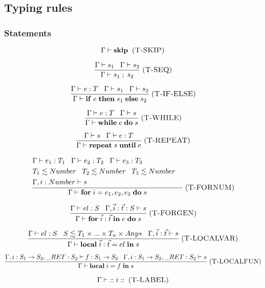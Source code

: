 \documentclass[12pt]{article}
\newcommand{\mylabel}[1]{\; (\textsc{#1})}
\newcommand{\kw}[1]{\mathbf{#1} \;}
\newcommand{\env}{\Gamma}
\newcommand{\ret}{\string_RET}
\begin{document}
\subsection{Typing rules}

\subsubsection{Statements}

\[
\env \vdash \kw{skip}
\mylabel{T-SKIP}
\]

\[
\frac{\env \vdash s_{1} \;\;\;
      \env \vdash s_{2}}
     {\env \vdash s_{1} \;;\; s_{2}}
\mylabel{T-SEQ}
\]

\[
\frac{\env \vdash e:T \;\;\;
      \env \vdash s_{1} \;\;\;
      \env \vdash s_{2}}
     {\env \vdash \kw{if} e \; \kw{then} s_{1} \; \kw{else} s_{2}}
\mylabel{T-IF-ELSE}
\]

\[
\frac{\env \vdash e:T \;\;\;
      \env \vdash s}
     {\env \vdash \kw{while} e \; \kw{do} s}
\mylabel{T-WHILE}
\]

\[
\frac{\env \vdash s \;\;\;
      \env \vdash e:T}
     {\env \vdash \kw{repeat} s \; \kw{until} e}
\mylabel{T-REPEAT}
\]

\[
\frac{\begin{aligned}
      & \env \vdash e_{1}:T_{1} \;\;\;
        \env \vdash e_{2}:T_{2} \;\;\;
        \env \vdash e_{3}:T_{3} &\\
      & T_{1} \lesssim Number \;\;\;
        T_{2} \lesssim Number \;\;\;
        T_{3} \lesssim Number &\\
      & \env, i:Number \vdash s &
      \end{aligned}}
     {\env \vdash \kw{for} i=e_{1},e_{2},e_{3} \; \kw{do} s}
\mylabel{T-FORNUM}
\]

\[
\frac{\env \vdash el:S \;\;\;
      \env, \vec{i}:\vec{t}:S \vdash s}
     {\env \vdash \kw{for} \vec{i}:\vec{t} \; \kw{in} e \; \kw{do} s}
\mylabel{T-FORGEN}
\]

\[
\frac{\env \vdash el:S \;\;\;
      S \lesssim T_{1} \times ... \times T_{n} \times {Any*} \;\;\;
      \env, \vec{i}:\vec{t} \vdash s}
     {\env \vdash \kw{local} \vec{i}:\vec{t} = el \; \kw{in} s}
\mylabel{T-LOCALVAR}
\]

\[
\frac{\env, i:S_{1} \rightarrow S_{2}, \ret:S_{2} \vdash f:S_{1} \rightarrow S_{2} \;\;\;
      \env, i:S_{1} \rightarrow S_{2}, \ret:S_{2} \vdash s}
     {\env \vdash \kw{local} i = f \; \kw{in} s}
\mylabel{T-LOCALFUN}
\]

\[
\env \vdash \kw{::} i \; \kw{::}
\mylabel{T-LABEL}
\]
\end{document}
